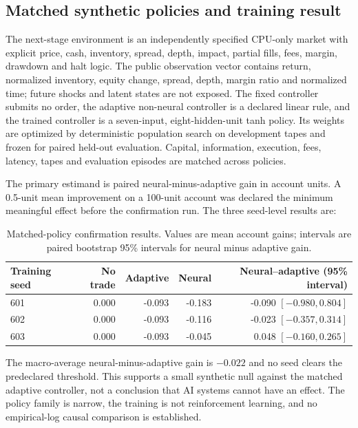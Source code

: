 \documentclass[11pt,a4paper]{article}
\theoremstyle{definition}
\theoremstyle{remark}
\begin{document}
\subsection{Matched synthetic policies and training result}
The next-stage environment is an independently specified CPU-only market with explicit price, cash, inventory, spread, depth, impact, partial fills, fees, margin, drawdown and halt logic. The public observation vector contains return, normalized inventory, equity change, spread, depth, margin ratio and normalized time; future shocks and latent states are not exposed. The fixed controller submits no order, the adaptive non-neural controller is a declared linear rule, and the trained controller is a seven-input, eight-hidden-unit tanh policy. Its weights are optimized by deterministic population search on development tapes and frozen for paired held-out evaluation. Capital, information, execution, fees, latency, tapes and evaluation episodes are matched across policies.

The primary estimand is paired neural-minus-adaptive gain in account units. A 0.5-unit mean improvement on a 100-unit account was declared the minimum meaningful effect before the confirmation run. The three seed-level results are:

\begin{table}[htbp]
\centering\small
\caption{Matched-policy confirmation results. Values are mean account gains; intervals are paired bootstrap 95\% intervals for neural minus adaptive gain.}
\label{tab:next_agent}
\begin{tabular}{lrrrr}
\toprule
Training seed & No trade & Adaptive & Neural & Neural--adaptive (95\% interval)\\
\midrule
601 & 0.000 & -0.093 & -0.183 & -0.090 $[-0.980,0.804]$\\
602 & 0.000 & -0.093 & -0.116 & -0.023 $[-0.357,0.314]$\\
603 & 0.000 & -0.093 & -0.045 & 0.048 $[-0.160,0.265]$\\
\bottomrule
\end{tabular}
\end{table}

The macro-average neural-minus-adaptive gain is $-0.022$ and no seed clears the predeclared threshold. This supports a small synthetic null against the matched adaptive controller, not a conclusion that AI systems cannot have an effect. The policy family is narrow, the training is not reinforcement learning, and no empirical-log causal comparison is established.
\end{document}
